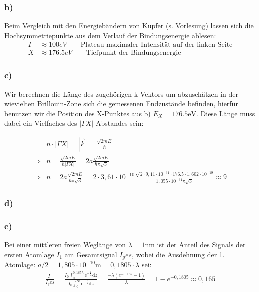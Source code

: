 \subsubsection*{b)}
Beim Vergleich mit den Energiebändern von Kupfer (s. Vorlesung) lassen sich die Hochsymmetriepunkte aus dem Verlauf der Bindungsenergie ablesen:
\begin{align*}
\Gamma &\approx 100 \unit{eV}\qquad\text{Plateau maximaler  Intensität auf der linken Seite}\\
X &\approx 176.5\unit{eV} \qquad\text{Tiefpunkt der Bindungsenergie}
\end{align*}
\subsubsection*{c)}
Wir berechnen die Länge des zugehörigen k-Vektors um abzuschätzen in der wievielten
Brillouin-Zone sich die gemessenen Endzustände befinden, hierfür benutzen wir die
Position des X-Punktes aus b) $E_X = 176.5 \mathrm{eV}$. Diese Länge muss dabei ein
Vielfaches des $|\Gamma X|$ Abstandes sein:


\begin{align*}
&n\cdot |\Gamma X| = |\vec{k}| = \frac{\sqrt{2mE}}{\hbar}\\
\Rightarrow & n = \frac{\sqrt{2mE}}{\hbar|\Gamma X|} = 2a\frac{\sqrt{2mE}}{\hbar\pi\sqrt{3}}\\
\Rightarrow & n =  2a\frac{\sqrt{2mE}}{\hbar\pi\sqrt{3}} = 2\cdot3,61\cdot10^{-10}\frac{\sqrt{2\cdot9,11\cdot10^{-31}\cdot176.5\cdot1,602\cdot10^{-19}}}{1,055\cdot10^{-34}\pi\sqrt{3}} \approx 9
\end{align*}
\subsubsection*{d)}

\subsubsection*{e)}
Bei einer mittleren freien Weglänge von $\lambda = 1\mathrm{nm}$ ist der Anteil des Signals der ersten Atomlage $I_1$ am Gesamtsignal $I_ges$, wobei die Ausdehnung der 1. Atomlage: $a/2 = 1,805\cdot10^{-10} \mathrm{m} = 0,1805\cdot \lambda$ sei:
\begin{align*}
\frac{I_1}{I_ges} = \frac{I_0\int_0^{0,185\lambda}\mathrm{e}^{-\frac{z}{\lambda}}\mathrm{d}z}{I_0\int_0^{\infty}\mathrm{e}^{-\frac{z}{\lambda}}\mathrm{d}z} = \frac{-\lambda(e^{-0,185}-1)}{\lambda} = 1-e^{-0,1805} \approx 0,165
\end{align*}

